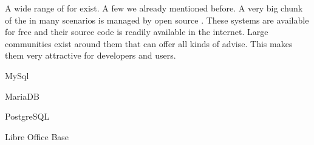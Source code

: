 %
%
A wide range of  for  exist.
A few we already mentioned before.%
%
%
A very big chunk of the  in many scenarios is managed by open source .
These systems are available for free and their source code is readily available in the internet.
Large communities exist around them that can offer all kinds of advise.
This makes them very attractive for developers and users.

MySql

MariaDB

PostgreSQL

Libre Office Base
\endhsection
%
\endhsection%
%
